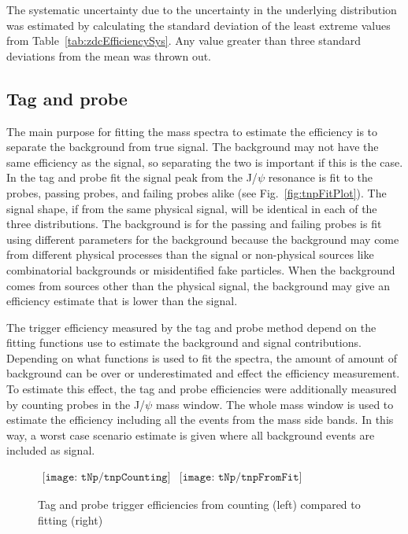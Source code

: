       The systematic uncertainty due to the uncertainty in the 
        underlying distribution was estimated by calculating the standard 
        deviation of the least extreme values from 
        Table~\ref{tab:zdcEfficiencySys}.
      Any value greater than three standard deviations from the mean was thrown
        out. 

    \subsection{Tag and probe}
      The main purpose for fitting the mass spectra to estimate the efficiency
        is to separate the background from true signal. 
      The background may not have the same efficiency as the signal, so 
        separating the two is important if this is the case.
      In the tag and probe fit the signal peak from the J/$\psi$ resonance
        is fit to the probes, passing probes, and failing probes alike (see
        Fig.~\ref{fig:tnpFitPlot}). 
      The signal shape, if from the same physical signal, will be 
        identical in each of the three distributions. 
      The background is for the passing and failing probes is fit using 
        different parameters for the background because the background
        may come from different physical processes than the signal or 
        non-physical sources like combinatorial backgrounds or misidentified
        fake particles.
      When the background comes from sources other than the physical signal,
        the background may give an efficiency estimate that is lower than
        the signal. 

      The trigger efficiency measured by the tag and probe method depend on
        the fitting functions use to estimate the background and signal 
        contributions. 
      Depending on what functions is used to fit the spectra, the amount of
        amount of background can be over or underestimated and effect the 
        efficiency measurement.
      To estimate this effect, the tag and probe efficiencies were additionally
        measured by counting probes in the J/$\psi$ mass window. 
      The whole mass window is used to estimate the efficiency including all 
        the events from the mass side bands.
      In this way, a worst case scenario estimate is given where all background
        events are included as signal. 
      \begin{figure}[!Hhbt]
        \centering
        $ \begin{array}{cc}
          \texttt{[image: tNp/tnpCounting]} &
          \texttt{[image: tNp/tnpFromFit]}
        \end{array} $ 
        \caption{Tag and probe trigger efficiencies from counting (left) 
          compared to fitting (right)}
        \label{fig:tnpCntVFit}
      \end{figure}

